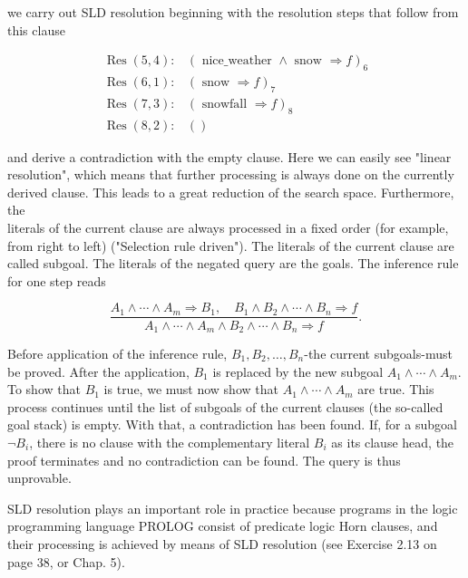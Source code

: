 \documentclass[10pt]{book}
\begin{document}
we carry out SLD resolution beginning with the resolution steps that follow from this clause

$$
\begin{array}{ll}
\operatorname{Res}(5,4): & (\text { nice_weather } \wedge \text { snow } \Rightarrow f)_{6} \\
\operatorname{Res}(6,1): & (\text { snow } \Rightarrow f)_{7} \\
\operatorname{Res}(7,3): & (\text { snowfall } \Rightarrow f)_{8} \\
\operatorname{Res}(8,2): & ()
\end{array}
$$

and derive a contradiction with the empty clause. Here we can easily see "linear resolution", which means that further processing is always done on the currently derived clause. This leads to a great reduction of the search space. Furthermore, the\\
literals of the current clause are always processed in a fixed order (for example, from right to left) ("Selection rule driven"). The literals of the current clause are called subgoal. The literals of the negated query are the goals. The inference rule for one step reads


$$
\frac{A_{1} \wedge \cdots \wedge A_{m} \Rightarrow B_{1}, \quad B_{1} \wedge B_{2} \wedge \cdots \wedge B_{n} \Rightarrow f}{A_{1} \wedge \cdots \wedge A_{m} \wedge B_{2} \wedge \cdots \wedge B_{n} \Rightarrow f} .
$$

Before application of the inference rule, $B_{1}, B_{2}, \ldots, B_{n}$-the current subgoals-must be proved. After the application, $B_{1}$ is replaced by the new subgoal $A_{1} \wedge \cdots \wedge A_{m}$. To show that $B_{1}$ is true, we must now show that $A_{1} \wedge \cdots \wedge A_{m}$ are true. This process continues until the list of subgoals of the current clauses (the so-called goal stack) is empty. With that, a contradiction has been found. If, for a subgoal $\neg B_{i}$, there is no clause with the complementary literal $B_{i}$ as its clause head, the proof terminates and no contradiction can be found. The query is thus unprovable.

SLD resolution plays an important role in practice because programs in the logic programming language PROLOG consist of predicate logic Horn clauses, and their processing is achieved by means of SLD resolution (see Exercise 2.13 on page 38, or Chap. 5).
\end{document}

